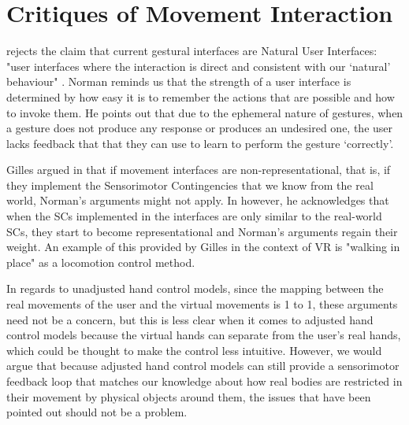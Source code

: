\section{Critiques of Movement Interaction}
\label{sec:critiquesMovementInteraction}

\parencite{Norman2010} rejects the claim that current gestural interfaces are Natural User Interfaces: "user interfaces where the interaction is direct and consistent with our ‘natural’ behaviour" \parencite{HvasMortensen2017}. Norman reminds us that the strength of a user interface is determined by how easy it is to remember the actions that are possible and how to invoke them. He points out that due to the ephemeral nature of gestures, when a gesture does not produce any response or produces an undesired one, the user lacks feedback that that they can use to learn to perform the gesture ‘correctly’.

Gilles argued in \parencite{Gillies2014} that if movement interfaces are non-representational, that is, if they implement the Sensorimotor Contingencies that we know from the real world, Norman's arguments might not apply. In \parencite{Gillies2016} however, he acknowledges that when the SCs implemented in the interfaces are only similar to the real-world SCs, they start to become representational and Norman's arguments regain their weight. An example of this provided by Gilles in the context of VR is "walking in place" as a locomotion control method.

In regards to unadjusted hand control models, since the mapping between the real movements of the user and the virtual movements is 1 to 1, these arguments need not be a concern, but this is less clear when it comes to adjusted hand control models because the virtual hands can separate from the user's real hands, which could be thought to make the control less intuitive. However, we would argue that because adjusted hand control models can still provide a sensorimotor feedback loop \parencite{Gillies2014} that matches our knowledge about how real bodies are restricted in their movement by physical objects around them, the issues that have been pointed out should not be a problem.

